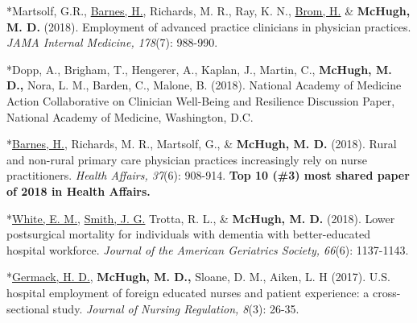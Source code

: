 \documentclass[10pt,]{article}
\begin{document}
{{{{{{{{{{{{{{{\begin{hangparas}{.25in}{1}
\end{hangparas}



\begin{hangparas}{.25in}{1}

*Martsolf, G.R., {\underline {Barnes, H.}}, Richards, M. R., Ray, K. N., {\underline {Brom, H.}} \& {\textbf {McHugh, M. D.}} (2018). Employment of advanced practice clinicians in physician practices. {\textit {JAMA Internal Medicine, 178}}(7): 988-990.

\end{hangparas}



\begin{hangparas}{.25in}{1}

*Dopp, A., Brigham, T., Hengerer, A., Kaplan, J., Martin, C., {\textbf {McHugh, M. D.,}} Nora, L. M., Barden, C., Malone, B. (2018). National Academy of Medicine Action Collaborative on Clinician Well-Being and Resilience Discussion Paper, National Academy of Medicine, Washington, D.C.

\end{hangparas}


\begin{hangparas}{.25in}{1}

*{\underline {Barnes, H.}}, Richards, M. R., Martsolf, G., \& {\textbf {McHugh, M. D.}} (2018). Rural and non-rural primary care physician practices increasingly rely on nurse practitioners. {\textit {Health Affairs, 37}}(6): 908-914. {\textbf {Top 10 (\#3) most shared paper of 2018 in Health Affairs.}}

\end{hangparas}



\begin{hangparas}{.25in}{1}

*{\underline {White, E. M.}}, {\underline {Smith, J. G.}} Trotta, R. L., \& {\textbf {McHugh, M. D.}} (2018). Lower postsurgical mortality for individuals with dementia with better-educated hospital workforce. {\textit {Journal of the American Geriatrics Society, 66}}(6): 1137-1143.

\end{hangparas}



\begin{hangparas}{.25in}{1}

*{\underline {Germack, H. D.}}, {\textbf {McHugh, M. D.,}} Sloane, D. M., Aiken, L. H (2017). U.S. hospital employment of foreign educated nurses and patient experience: a cross-sectional study. {\textit {Journal of Nursing Regulation, 8}}(3): 26-35.


\end{hangparas}}}}}}}}}}}}}}}}
\end{document}
